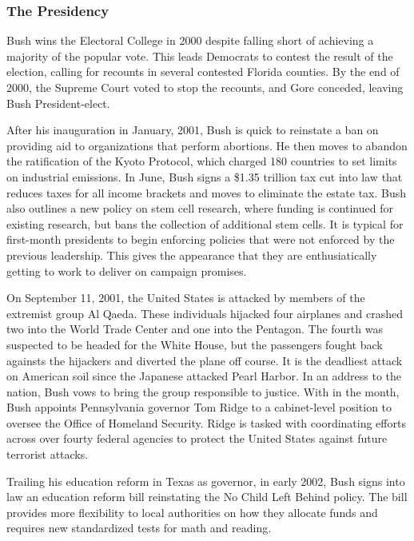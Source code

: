 \documentclass{article}
\begin{document}
        \subsubsection{The Presidency}
        Bush wins the Electoral College in 2000 despite falling short of achieving a majority of the popular vote. This leads Democrats to contest the result of the election, calling for recounts in several contested Florida counties. By the end of 2000, the Supreme Court voted to stop the recounts, and Gore conceded, leaving Bush President-elect.
        \par
        After his inauguration in January, 2001, Bush is quick to reinstate a ban on providing aid to organizations that perform abortions. He then moves to abandon the ratification of the Kyoto Protocol, which charged 180 countries to set limits on industrial emissions. In June, Bush signs a \$1.35 trillion tax cut into law that reduces taxes for all income brackets and moves to eliminate the estate tax. Bush also outlines a new policy on stem cell research, where funding is continued for existing research, but bans the collection of additional stem cells.\cite{bushevents} It is typical for first-month presidents to begin enforcing policies that were not enforced by the previous leadership. This gives the appearance that they are enthusiatically getting to work to deliver on campaign promises.
        \par
        On September 11, 2001, the United States is attacked by members of the extremist group Al Qaeda. These individuals hijacked four airplanes and crashed two into the World Trade Center and one into the Pentagon. The fourth was suspected to be headed for the White House, but the passengers fought back againsts the hijackers and diverted the plane off course. It is the deadliest attack on American soil since the Japanese attacked Pearl Harbor. In an address to the nation, Bush vows to bring the group responsible to justice. With in the month, Bush appoints Pennsylvania governor Tom Ridge to a cabinet-level position to oversee the Office of Homeland Security. Ridge is tasked with coordinating efforts across over fourty federal agencies to protect the United States against future terrorist attacks.\cite{bushevents}
        \par
        Trailing his education reform in Texas as governor, in early 2002, Bush signs into law an education reform bill reinstating the No Child Left Behind policy. The bill provides more flexibility to local authorities on how they allocate funds and requires new standardized tests for math and reading.\cite{bushevents}
\end{document}
